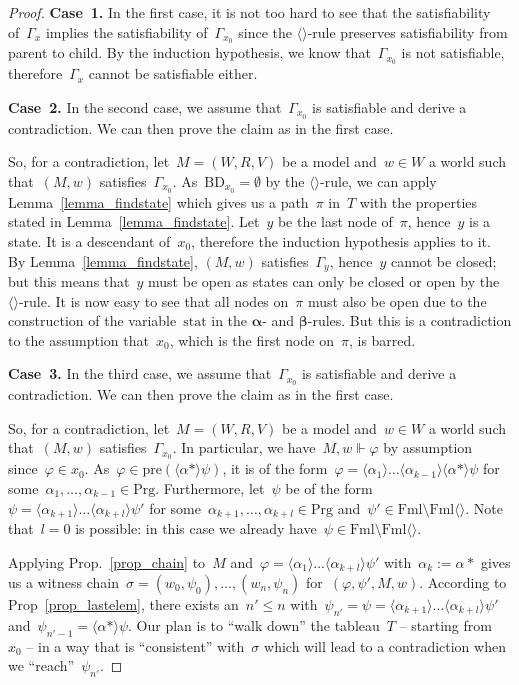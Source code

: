 \documentclass{entcs}
\newcommand{\pea}[2]{\langle#1\rangle #2}
\newcommand{\prp}[1]{#1*}
\newcommand{\fml}{\mathrm{Fml}}
\newcommand{\prg}{\mathrm{Prg}}
\newcommand{\fmlea}{\mathrm{Fml}\pea{}{}}
\newcommand{\psr}[2]{#1 \Vdash #2}
\newcommand{\ppre}[1]{\mathrm{pre}(#1)}
\newcommand{\tbdia}{\mathrm{BD}}
\newcommand{\tmrk}{\mathrm{stat}}
\newcommand{\talpha}{\boldsymbol{\alpha}}
\newcommand{\tbeta}{\boldsymbol{\beta}}
\newcommand{\trea}{$\langle\rangle$}
\newcommand{\fchn}{\sigma}
\begin{document}
\begin{proof}
  \noindent{}\textbf{Case~1.}
  In the first case,
  it is not too hard to see
  that the satisfiability of~$\Gamma_x$ implies the satisfiability of~$\Gamma_{x_0}$
  since the \trea{}-rule preserves satisfiability from parent to child.
  By the induction hypothesis,
  we know that~$\Gamma_{x_0}$ is not satisfiable,
  therefore~$\Gamma_x$ cannot be satisfiable either.

  \noindent{}\textbf{Case~2.}
  In the second case,
  we assume that~$\Gamma_{x_0}$ is satisfiable and derive a contradiction.
  We can then prove the claim as in the first case.

  So, for a contradiction,
  let~$M = (W,R,V)$ be a model and~$w \in W$ a world
  such that~$(M, w)$ satisfies~$\Gamma_{x_0}$.
  As~$\tbdia_{x_0} = \emptyset$ by the \trea{}-rule,
  we can apply Lemma~\ref{lemma_findstate}
  which gives us a path~$\pi$ in~$T$ with the properties stated in Lemma~\ref{lemma_findstate}.
  Let~$y$ be the last node of~$\pi$, hence~$y$ is a state.
  It is a descendant of~$x_0$,
  therefore the induction hypothesis applies to it.
  By Lemma~\ref{lemma_findstate}, $(M, w)$ satisfies~$\Gamma_y$,
  hence~$y$ cannot be closed;
  but this means that~$y$ must be open 
  as states can only be closed or open by the \trea{}-rule.
  It is now easy to see that all nodes on~$\pi$ must also be open 
  due to the construction of the variable~$\tmrk$ in the $\talpha$- and $\tbeta$-rules.
  But this is a contradiction to the assumption
  that~$x_0$, which is the first node on~$\pi$, is barred.

  \noindent{}\textbf{Case~3.}
  In the third case,
  we assume that~$\Gamma_{x_0}$ is satisfiable and derive a contradiction.
  We can then prove the claim as in the first case.

  So, for a contradiction,
  let~$M = (W,R,V)$ be a model and~$w \in W$ a world
  such that~$(M, w)$ satisfies~$\Gamma_{x_0}$.
  In particular, we have~$\psr{M,w}{\varphi}$ by assumption since~$\varphi \in x_0$.
  As~$\varphi \in \ppre{\pea{\prp{\alpha}}{\psi}}$,
  it is of the form~$\varphi = \pea{\alpha_1}{\dotsc \pea{\alpha_{k-1}}{\pea{\prp{\alpha}}{\psi}}}$
  for some~$\alpha_1, \dots, \alpha_{k-1} \in \prg$.
  Furthermore,
  let~$\psi$ be of the form~$\psi = \pea{\alpha_{k+1}}{\dotsc \pea{\alpha_{k+l}}{\psi'}}$
  for some~$\alpha_{k+1}, \dots, \alpha_{k+l} \in \prg$ and~$\psi' \in \fml \setminus \fmlea$.
  Note that~$l = 0$ is possible:
  in this case we already have~$\psi \in \fml \setminus \fmlea$.

  Applying Prop.~\ref{prop_chain} to~$M$ and~$\varphi = \pea{\alpha_1}{\dotsc \pea{\alpha_{k+l}}{\psi'}}$
  with~$\alpha_k := \prp{\alpha}$
  gives us a witness chain~$\fchn = (w_0, \psi_0), \dotsc, (w_n, \psi_n)$ for~$(\varphi, \psi', M, w)$.
  According to Prop~\ref{prop_lastelem},
  there exists an~$n' \leq n$ with~$\psi_{n'} = \psi = \pea{\alpha_{k+1}}{\dotsc \pea{\alpha_{k+l}}{\psi'}}$
  and~$\psi_{n'-1} = \pea{\prp{\alpha}}{\psi}$.
  Our plan is to ``walk down'' the tableau~$T$ -- starting from~$x_0$ --
  in a way that is ``consistent'' with~$\fchn$
  which will lead to a contradiction when we ``reach''~$\psi_{n'}$.


\end{proof}
\end{document}
